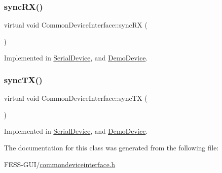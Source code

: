 \subsubsection{\texorpdfstring{sync\+R\+X()}{syncRX()}}
{\footnotesize\ttfamily virtual void Common\+Device\+Interface\+::sync\+RX (\begin{DoxyParamCaption}{ }\end{DoxyParamCaption})\hspace{0.3cm}{\ttfamily [pure virtual]}}



Implemented in \hyperlink{class_serial_device_a79c9685f76771703557b2044e941f27a}{Serial\+Device}, and \hyperlink{class_demo_device_a85671c408f6f08d82a09344ef5f34966}{Demo\+Device}.

\hypertarget{class_common_device_interface_acae4ab2226a4f1388b2af355ac2e4f86}{}\label{class_common_device_interface_acae4ab2226a4f1388b2af355ac2e4f86} 
\subsubsection{\texorpdfstring{sync\+T\+X()}{syncTX()}}
{\footnotesize\ttfamily virtual void Common\+Device\+Interface\+::sync\+TX (\begin{DoxyParamCaption}{ }\end{DoxyParamCaption})\hspace{0.3cm}{\ttfamily [pure virtual]}}



Implemented in \hyperlink{class_serial_device_a8e53f81ff51ef332a03c3276804a32c8}{Serial\+Device}, and \hyperlink{class_demo_device_a4b33b0148627fcbd22a0704e80f05d7d}{Demo\+Device}.



The documentation for this class was generated from the following file\+:\begin{DoxyCompactItemize}
\item 
F\+E\+S\+S-\/\+G\+U\+I/\hyperlink{commondeviceinterface_8h}{commondeviceinterface.\+h}\end{DoxyCompactItemize}
